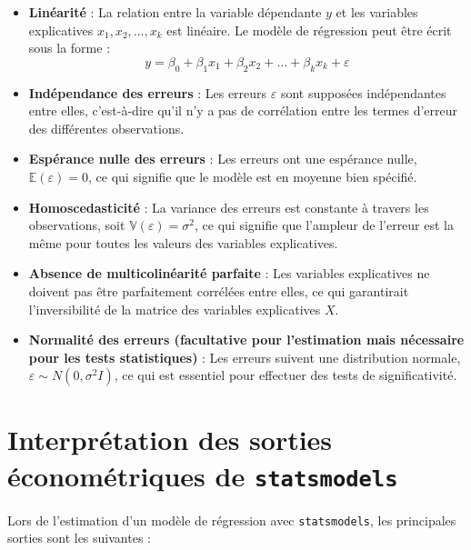 \documentclass[a4paper,12pt]{article}
\begin{document}
	\begin{itemize}
		\item \textbf{Linéarité} : La relation entre la variable dépendante \( y \) et les variables explicatives \( x_1, x_2, \dots, x_k \) est linéaire. Le modèle de régression peut être écrit sous la forme :  
		\[
		y = \beta_0 + \beta_1 x_1 + \beta_2 x_2 + \dots + \beta_k x_k + \varepsilon
		\]
		
		\item \textbf{Indépendance des erreurs} : Les erreurs \( \varepsilon \) sont supposées indépendantes entre elles, c'est-à-dire qu'il n'y a pas de corrélation entre les termes d'erreur des différentes observations.
		
		\item \textbf{Espérance nulle des erreurs} : Les erreurs ont une espérance nulle, \( \mathbb{E}(\varepsilon) = 0 \), ce qui signifie que le modèle est en moyenne bien spécifié.
		
		\item \textbf{Homoscedasticité} : La variance des erreurs est constante à travers les observations, soit \( \mathbb{V}(\varepsilon) = \sigma^2 \), ce qui signifie que l'ampleur de l'erreur est la même pour toutes les valeurs des variables explicatives.
		
		\item \textbf{Absence de multicolinéarité parfaite} : Les variables explicatives ne doivent pas être parfaitement corrélées entre elles, ce qui garantirait l'inversibilité de la matrice des variables explicatives \( X \).
		
		\item \textbf{Normalité des erreurs (facultative pour l'estimation mais nécessaire pour les tests statistiques)} : Les erreurs suivent une distribution normale, \( \varepsilon \sim N(0, \sigma^2 I) \), ce qui est essentiel pour effectuer des tests de significativité.
	\end{itemize}
	
	\section{Interprétation des sorties économétriques de \texttt{statsmodels}}
	
	Lors de l'estimation d'un modèle de régression avec \texttt{statsmodels}, les principales sorties sont les suivantes :
	
\end{document}
